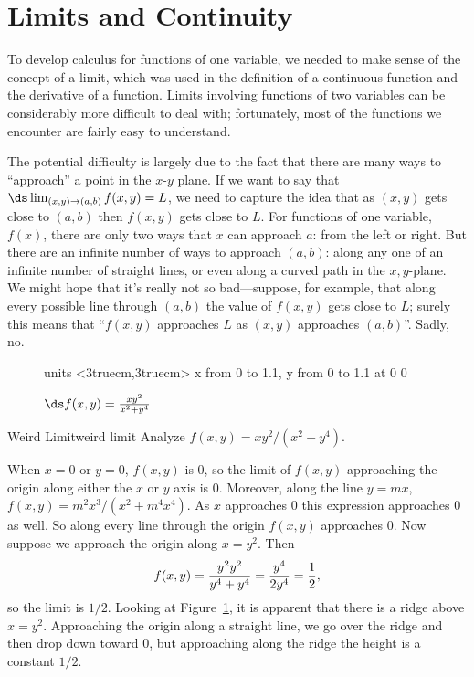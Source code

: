 \section{Limits and Continuity}\label{sec:LimitsContinuityPartialDifferentiation}

To develop calculus for functions of one variable, we needed to make
sense of the concept of a limit, which was used in the definition of a
continuous function and the derivative of a function. Limits involving
functions of two variables can be considerably more difficult to deal
with; fortunately, most of the functions we encounter are fairly easy
to understand.

The potential difficulty is largely due to the fact that there are
many ways to ``approach'' a point in the $x$-$y$ plane. If we want to
say that $\ds\lim_{(x,y)\to(a,b)}f(x,y)=L$, we need to capture the
idea that as $(x,y)$ gets close to $(a,b)$ then $f(x,y)$ gets close to
$L$. For functions of one variable, $f(x)$, there are only two ways
that $x$ can approach $a$: from the left or right. But there are an
infinite number of ways to approach $(a,b)$: along any one of an
infinite number of straight lines, or even along a curved path in the $x,y$-plane. We might hope that it's
really not so bad---suppose, for example, that along every possible
line through $(a,b)$ the value of $f(x,y)$ gets close to $L$; surely
this means that ``$f(x,y)$ approaches $L$ as $(x,y)$ approaches
$(a,b)$''. Sadly, no.

\begin{figure}[H]
\centerline{
\vbox{\beginpicture
\normalgraphs
\setcoordinatesystem units <3truecm,3truecm>
\setplotarea x from 0 to 1.1, y from 0 to 1.1
 at 0 0
\endpicture}}
\caption{$\ds f(x,y)={xy^2\over x^2+y^4}$}
\label{fig:weird limit}
\end{figure}

\begin{example}{Weird Limit}{weird limit}
Analyze $f(x,y)=xy^2/(x^2+y^4)$.
\end{example}
\begin{solution}
When $x=0$ or $y=0$, $f(x,y)$ is 0, so the limit of $f(x,y)$ approaching the
origin along either the $x$ or $y$ axis is 0. Moreover, along the line
$y=mx$, $f(x,y)=m^2x^3/(x^2+m^4x^4)$. As $x$ approaches 0 this expression
approaches 0 as well. So along every line through the origin $f(x,y)$
approaches 0. Now suppose we approach the origin along $x=y^2$. Then 
$$f(x,y)={y^2y^2\over y^4+y^4}={y^4\over2y^4}={1\over2},$$
so the limit is $1/2$. Looking at Figure~\ref{fig:weird limit}, it
is apparent that there is a ridge above $x=y^2$. Approaching the
origin along a straight line, we go over the ridge and then drop down
toward 0, but approaching along the ridge the height is a constant
$1/2$. 
\end{solution}

